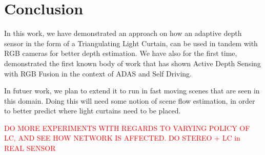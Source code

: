 \section{Conclusion}

In this work, we have demonstrated an approach on how an adaptive depth sensor in the form of a Triangulating Light Curtain, can be used in tandem with RGB cameras for better depth estimation. We have also for the first time, demonstrated the first known body of work that has shown Active Depth Sensing with RGB Fusion in the context of ADAS and Self Driving.

In futuer work, we plan to extend it to run in fast moving scenes that are seen in this domain. Doing this will need 
some notion of scene flow estimation, in order to better predict where light curtains need to be placed.

\textcolor{red}{DO MORE EXPERIMENTS WITH REGARDS TO VARYING POLICY OF LC, AND SEE HOW NETWORK IS AFFECTED. DO STEREO + LC in REAL SENSOR}

